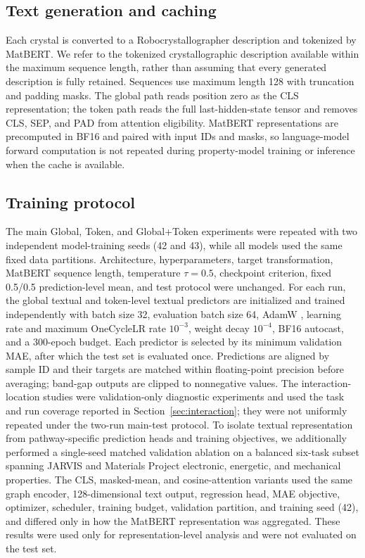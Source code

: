 \documentclass[a4paper,fleqn]{cas-sc}
\begin{document}
\subsection{Text generation and caching}
Each crystal is converted to a Robocrystallographer description and tokenized by MatBERT. We refer to the tokenized crystallographic description available within the maximum sequence length, rather than assuming that every generated description is fully retained. Sequences use maximum length 128 with truncation and padding masks. The global path reads position zero as the CLS representation; the token path reads the full last-hidden-state tensor and removes CLS, SEP, and PAD from attention eligibility. MatBERT representations are precomputed in BF16 and paired with input IDs and masks, so language-model forward computation is not repeated during property-model training or inference when the cache is available.

\subsection{Training protocol}
The main Global, Token, and Global+Token experiments were repeated with two independent model-training seeds (42 and 43), while all models used the same fixed data partitions. Architecture, hyperparameters, target transformation, MatBERT sequence length, temperature $\tau=0.5$, checkpoint criterion, fixed 0.5/0.5 prediction-level mean, and test protocol were unchanged. For each run, the global textual and token-level textual predictors are initialized and trained independently with batch size 32, evaluation batch size 64, AdamW \citep{loshchilov2019adamw}, learning rate and maximum OneCycleLR rate $10^{-3}$, weight decay $10^{-4}$, BF16 autocast, and a 300-epoch budget. Each predictor is selected by its minimum validation MAE, after which the test set is evaluated once. Predictions are aligned by sample ID and their targets are matched within floating-point precision before averaging; band-gap outputs are clipped to nonnegative values. The interaction-location studies were validation-only diagnostic experiments and used the task and run coverage reported in Section~\ref{sec:interaction}; they were not uniformly repeated under the two-run main-test protocol.
To isolate textual representation from pathway-specific prediction heads and training objectives, we additionally performed a single-seed matched validation ablation on a balanced six-task subset spanning JARVIS and Materials Project electronic, energetic, and mechanical properties. The CLS, masked-mean, and cosine-attention variants used the same graph encoder, 128-dimensional text output, regression head, MAE objective, optimizer, scheduler, training budget, validation partition, and training seed (42), and differed only in how the MatBERT representation was aggregated. These results were used only for representation-level analysis and were not evaluated on the test set.
\end{document}
